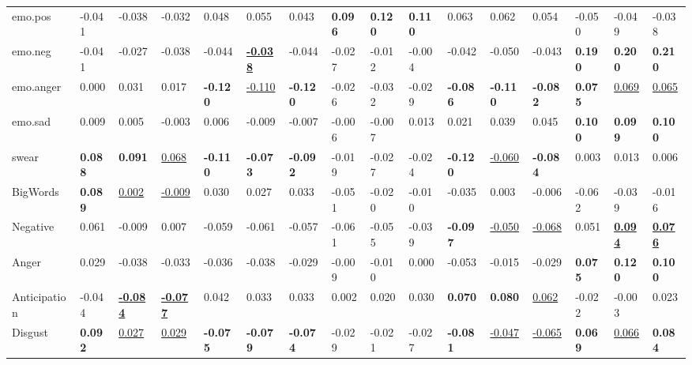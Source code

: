 \begin{table*}[ht]
{\begin{tabular}{p{1.6cm}p{0.95cm}p{0.95cm}p{0.95cm}|p{0.95cm}p{0.95cm}p{0.95cm}|p{0.95cm}p{0.95cm}p{0.95cm}|p{0.95cm}p{0.95cm}p{0.95cm}|p{0.95cm}p{0.95cm}p{0.95cm}p{0.95cm}}
emo.pos & -0.041 & -0.038 & -0.032 & 0.048& 0.055 & 0.043 & \textbf{0.096} & \textbf{0.120} & \textbf{0.110} & 0.063 & 0.062 & 0.054 & -0.050 & \multicolumn{2}{l}{-0.049} & -0.038 \\
emo.neg & -0.041 & -0.027 & -0.038 & -0.044& \underline{\textbf{-0.038}} & -0.044 & -0.027 & -0.012 & -0.004 & -0.042 & -0.050 & -0.043 & \textbf{0.190} & \multicolumn{2}{l}{\textbf{0.200}} & \textbf{0.210} \\
emo.anger & 0.000 & 0.031 & 0.017 & \textbf{-0.120}& \underline{-0.110} & \textbf{-0.120} & -0.026 & -0.032 & -0.029 & \textbf{-0.086} & \textbf{-0.110} & \textbf{-0.082} & \textbf{0.075} & \multicolumn{2}{l}{\underline{0.069}} & \underline{0.065} \\
emo.sad & 0.009 & 0.005 & -0.003 & 0.006& -0.009 & -0.007 & -0.006 & -0.007 & 0.013 & 0.021 & 0.039 & 0.045 & \textbf{0.100} & \multicolumn{2}{l}{\textbf{0.099}} & \textbf{0.100} \\
swear & \textbf{0.088} & \textbf{0.091} & \underline{0.068} & \textbf{-0.110}& \textbf{-0.073} & \textbf{-0.092} & -0.019 & -0.027 & -0.024 & \textbf{-0.120} & \underline{-}\underline{0.060} & \textbf{-0.084} & 0.003 & \multicolumn{2}{l}{0.013} & 0.006 \\
BigWords & \textbf{0.089} & \underline{0.002} & \underline{-0.009} & 0.030& 0.027 & 0.033 & -0.051 & -0.020 & -0.010 & -0.035 & 0.003 & -0.006 & -0.062 & \multicolumn{2}{l}{-0.039} & -0.016 \\
\midrule
Negative & 0.061 & -0.009 & 0.007 & -0.059& -0.061 & -0.057 & -0.061 & -0.055 & -0.039 & \textbf{-0.097} & \underline{-0.050} & \underline{-0.068} & 0.051 & \multicolumn{2}{l}{\underline{\textbf{0.094}}} & \underline{\textbf{0.076}} \\
Anger & 0.029 & -0.038 & -0.033 & -0.036& -0.038 & -0.029 & -0.009 & -0.010 & 0.000 & -0.053 & -0.015 & -0.029 & \textbf{0.075} & \multicolumn{2}{l}{\textbf{0.120}} & \textbf{0.100} \\
Anticipation & -0.044 & \underline{\textbf{-0.084}} & \underline{\textbf{-0.077}} & 0.042& 0.033 & 0.033 & 0.002 & 0.020 & 0.030 & \textbf{0.070} & \textbf{0.080} & \underline{0.062} & -0.022 & \multicolumn{2}{l}{-0.003} & 0.023 \\
Disgust & \textbf{0.092} & \underline{0.027} & \underline{0.029} & \textbf{-0.075}& \textbf{-0.079} & \textbf{-0.074} & -0.029 & -0.021 & -0.027 & \textbf{-0.081} & \underline{-0.047} & \underline{-0.065} & \textbf{0.069} & \multicolumn{2}{l}{\underline{0.066}} & \textbf{0.084} \\

\end{tabular}}
\end{table*}
